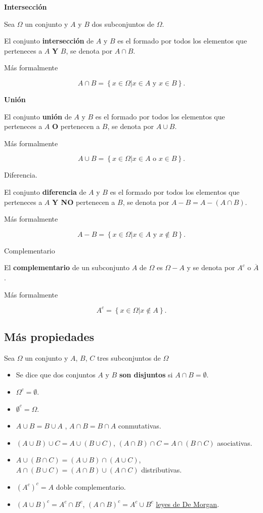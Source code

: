 \documentclass[
  letterpaper,
  DIV=11,
  numbers=noendperiod]{scrreprt}
\providecommand{\tightlist}{%
  \setlength{\itemsep}{0pt}\setlength{\parskip}{0pt}}\usepackage{longtable,booktabs,array}
\begin{document}
\textbf{Intersección}

Sea \(\Omega\) un conjunto y \(A\) y \(B\) dos subconjuntos de
\(\Omega\).

El conjunto \textbf{intersección} de \(A\) y \(B\) es el formado por
todos los elementos que perteneces a \(A\) \textbf{Y} \(B\), se denota
por \(A\cap B\).

Más formalmente

\[
A\cap B=\left\{x\in\Omega \big| x\in A \mbox{ y } x\in B\right\}.
\]

\textbf{Unión}

El conjunto \textbf{unión} de \(A\) y \(B\) es el formado por todos los
elementos que perteneces a \(A\) \textbf{O} pertenecen a \(B\), se
denota por \(A\cup B\).

Más formalmente

\[
A\cup B=\left\{x\in\Omega \big| x\in A \mbox{ o } x\in B\right\}.
\]

Diferencia.

El conjunto \textbf{diferencia} de \(A\) y \(B\) es el formado por todos
los elementos que perteneces a \(A\) \textbf{Y NO} pertenecen a \(B\),
se denota por \(A-B=A-(A\cap B)\).

Más formalmente

\[
A- B=\left\{x\in\Omega \big| x\in A \mbox{ y } x\notin B\right\}.
\]

Complementario

El \textbf{complementario} de un subconjunto \(A\) de \(\Omega\) es
\(\Omega-A\) y se denota por \(A^c\) o \(\overline{A}\).

Más formalmente

\[
A^c=\left\{x\in\Omega \big| x\not\in A\right\}.
\]

\subsection{Más propiedades}\label{muxe1s-propiedades}

Sea \(\Omega\) un conjunto y \(A\), \(B\), \(C\) tres subconjuntos de
\(\Omega\)

\begin{itemize}
\tightlist
\item
  Se dice que dos conjuntos \(A\) y \(B\) \textbf{son disjuntos} si
  \(A\cap B=\emptyset.\)
\item
  \(\Omega^c=\emptyset\).
\item
  \(\emptyset^c=\Omega\).
\item
  \(A\cup B=B \cup A\) , \(A\cap B=B\cap A\) conmutativas.
\item
  \((A\cup B) \cup C = A \cup( B \cup C)\),
  \((A\cap B) \cap C = A \cap( B \cap C)\) asociativas.
\item
  \(A\cup (B\cap C)=(A\cup B) \cap (A\cup C)\),
  \(A\cap (B\cup C)=(A\cap B) \cup (A\cap C)\) distributivas.
\item
  \(\left(A^c\right)^c=A\) doble complementario.
\item
  \(\left(A\cup B\right)^c=A^c \cap B^c\),
  \(\left(A\cap B\right)^c=A^c \cup B^c\)
  \href{https://es.wikipedia.org/wiki/Leyes_de_De_Morgan}{leyes de De
  Morgan}.
\end{itemize}
\end{document}
